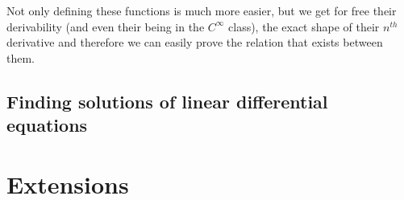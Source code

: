 \documentclass[submission,copyright]{eptcs}
\begin{document}
Not only defining these functions is much more easier, but we get for
free their derivability (and even their being in the $C^{\infty}$ class),
the exact shape of their $n^{th}$ derivative and therefore we can easily
prove the relation that exists between them.

\subsection{Finding solutions of linear differential equations}


\section{Extensions}

\end{document}
